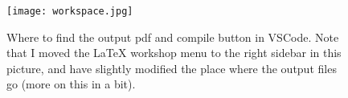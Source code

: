 \begin{figure}[ht!]
    \centering
    \texttt{[image: workspace.jpg]}
    \caption{Where to find the output pdf and compile button in VSCode. Note that I moved the LaTeX workshop menu to the right sidebar in this picture, and have slightly modified the place where the output files go (more on this in a bit).}
    \label{fig:workspace}
\end{figure}